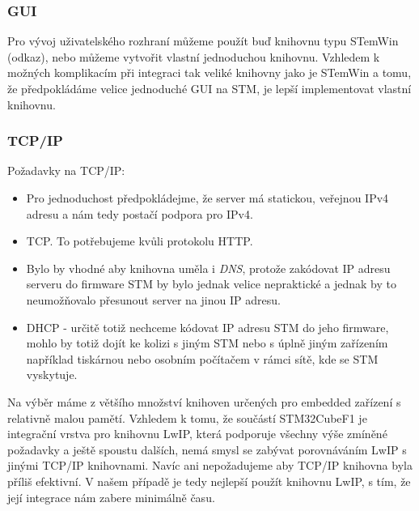 \subsubsection{GUI}
Pro vývoj uživatelského rozhraní můžeme použít buď knihovnu typu STemWin (odkaz), nebo můžeme
vytvořit vlastní jednoduchou knihovnu.
Vzhledem k možných komplikacím při integraci tak veliké knihovny jako je STemWin a tomu, že
předpokládáme velice jednoduché GUI na STM, je lepší implementovat vlastní knihovnu.

\subsubsection{TCP/IP}
Požadavky na TCP/IP:
\begin{itemize}
  \item Pro jednoduchost předpokládejme, že server má statickou, veřejnou IPv4 adresu a nám tedy
    postačí podpora pro IPv4.
  \item TCP. To potřebujeme kvůli protokolu HTTP.
  \item Bylo by vhodné aby knihovna uměla i \emph{DNS}, protože zakódovat IP adresu serveru do firmware
    STM by bylo jednak velice nepraktické a jednak by to neumožňovalo přesunout server na jinou
    IP adresu.
  \item DHCP - určitě totiž nechceme kódovat IP adresu STM do jeho firmware, mohlo by totiž dojít
    ke kolizi s jiným STM nebo s úplně jiným zařízením například tiskárnou nebo osobním počítačem
    v rámci sítě, kde se STM vyskytuje.
\end{itemize}
Na výběr máme z většího množství knihoven určených pro embedded zařízení s relativně malou pamětí.
Vzhledem k tomu, že součástí STM32CubeF1 je integrační vrstva pro knihovnu LwIP, která podporuje
všechny výše zmíněné požadavky a ještě spoustu dalších, nemá smysl se zabývat porovnáváním LwIP
s jinými TCP/IP knihovnami.
Navíc ani nepožadujeme aby TCP/IP knihovna byla příliš efektivní.
V našem případě je tedy nejlepší použít knihovnu LwIP, s tím, že její integrace nám zabere minimálně
času.

